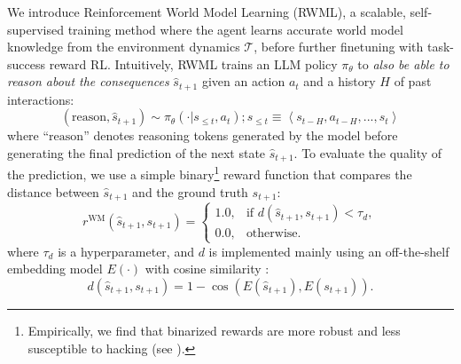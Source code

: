 \documentclass{article}
\theoremstyle{plain}
\theoremstyle{definition}
\theoremstyle{remark}
\newcommand{\method}[0]{Reinforcement World Model Learning}
\newcommand{\shortmethod}[0]{RWML}
\newcommand{\wmrl}[0]{\method}
\newcommand{\wmrlshort}[0]{\shortmethod}
\begin{document}
We introduce \wmrl{} (\wmrlshort{}), a scalable, self-supervised training method where the agent learns accurate world model knowledge from the environment dynamics $\mathcal{T}$, before further finetuning with task-success reward RL.
Intuitively, \wmrlshort{} trains an LLM policy $\pi_\theta$ to \emph{also be able to reason about the consequences} $\hat{s}_{t+1}$ given an action $a_{t}$ and a history $H$ of past interactions:
\[
(\mathrm{reason},\hat{s}_{t+1}) \sim \pi_\theta(\cdot | s_{\le t}, a_t); s_{\le t} \equiv \left\langle s_{t-H}, a_{t-H}, ..., s_t \right\rangle
\]
where ``$\mathrm{reason}$'' denotes reasoning tokens generated by the model before generating the final prediction of the next state $\hat{s}_{t+1}$.
To evaluate the quality of the prediction, we use a simple binary\footnote{Empirically, we find that binarized rewards are more robust and less susceptible to hacking (see ).} reward function that compares the distance between $\hat{s}_{t+1}$ and the ground truth $s_{t+1}$:
\[
r^{\mathrm{WM}}(\hat{s}_{t+1}, s_{t+1}) = \begin{cases}
1.0, & \text{if } d(\hat{s}_{t+1}, s_{t+1}) < \tau_{d}, \\
0.0, & \text{otherwise}.
\end{cases}
\] 
where $\tau_d$ is a hyperparameter, and $d$ is implemented mainly using an off-the-shelf embedding model $E(\cdot)$ with cosine similarity \citep{karpukhin2020densepassageretrievalopendomain,zhang2025qwen3embeddingadvancingtext}:
\[
d(\hat{s}_{t+1}, s_{t+1}) = 1 - \cos(E(\hat{s}_{t+1}), E(s_{t+1})).
\] 
\end{document}
